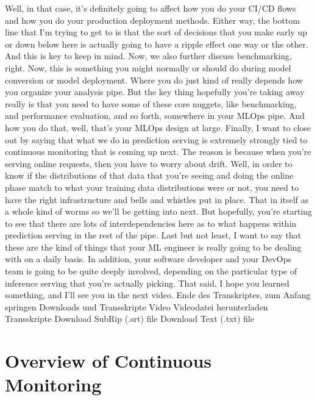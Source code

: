 {{{{{{{{    Well, in that case, it's definitely going
    to affect how you do your CI/CD flows and how you
    do your production deployment methods.
    Either way, the bottom line that I'm trying to get to
    is that the sort of decisions that you make early up or down below here
    is actually going to have a ripple effect one way or the other.
    And this is key to keep in mind.
    Now, we also further discuss benchmarking, right.
    Now, this is something you might normally
    or should do during model conversion or model deployment.
    Where you do just kind of really depends how you organize your analysis pipe.
    But the key thing hopefully you're taking away really
    is that you need to have some of these core nuggets,
    like benchmarking, and performance evaluation,
    and so forth, somewhere in your MLOps pipe.
    And how you do that, well, that's your MLOps design at large.
    Finally, I want to close out by saying that what we do in prediction serving
    is extremely strongly tied to continuous monitoring that is coming up next.
    The reason is because when you're serving online requests,
    then you have to worry about drift.
    Well, in order to know if the distributions of that data that you're
    seeing and doing the online phase match to what your training data
    distributions were or not, you need to have the right infrastructure and bells
    and whistles put in place.
    That in itself as a whole kind of worms so we'll be getting into next.
    But hopefully, you're starting to see that there
    are lots of interdependencies here as to what happens within prediction
    serving in the rest of the pipe.
    Last but not least, I want to say that these
    are the kind of things that your ML engineer is really going
    to be dealing with on a daily basis.
    In addition, your software developer and your DevOps team
    is going to be quite deeply involved, depending
    on the particular type of inference serving that you're actually picking.
    That said, I hope you learned something, and I'll see you in the next video.
    Ende des Transkriptes, zum Anfang springen
    Downloads und Transskripte
    Video
    Videodatei herunterladen
    Transskripte
    Download SubRip (.srt) file
    Download Text (.txt) file        
        
        
\section{Overview of Continuous Monitoring}

}}}}}}}}
